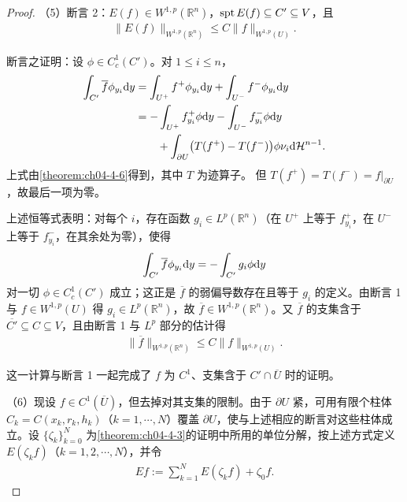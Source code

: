 \documentclass[../../main.tex]{subfiles}%
\begin{document}
\begin{proof}
（5）断言 2：$E(f)\in W^{1,p}(\mathbb{R}^n)$，$\operatorname{spt} E(f)\subseteq C'\subseteq V$，且
\begin{align*}
\lVert E(f)\rVert_{W^{1,p}(\mathbb{R}^n)}\leqslant C\lVert f\rVert_{W^{1,p}(U)}.
\end{align*}

断言之证明：设 $\phi\in C_c^1(C')$。对 $1\leqslant i\leqslant n$，
\begin{align*}
\int_{C'}\overline{f}\phi_{y_i}\mathrm{d} y
&=\int_{U^+}f^+\phi_{y_i}\mathrm{d} y+\int_{U^-}f^-\phi_{y_i}\mathrm{d} y\\
&=-\int_{U^+}f^+_{y_i}\phi\mathrm{d} y-\int_{U^-}f^-_{y_i}\phi\mathrm{d} y\\
&\qquad+\int_{\partial U}\bigl(T(f^+)-T(f^-)\bigr)\phi\nu_i\mathrm{d}\mathcal{H}^{n-1}.
\end{align*}
上式由\cref{theorem:ch04-4-6}得到，其中 $T$ 为迹算子。%
但 $T(f^+)=T(f^-)=f|_{\partial U}$，故最后一项为零。

上述恒等式表明：对每个 $i$，存在函数 $g_i\in L^p(\mathbb{R}^n)$（在 $U^+$ 上等于 $f^+_{y_i}$，在 $U^-$ 上等于 $f^-_{y_i}$，在其余处为零），使得
\begin{align*}
\int_{C'}\overline{f}\phi_{y_i}\mathrm{d} y=-\int_{C'}g_i\phi\mathrm{d} y
\end{align*}
对一切 $\phi\in C_c^1(C')$ 成立；这正是 $\overline{f}$ 的弱偏导数存在且等于 $g_i$ 的定义。由断言 1 与 $f\in W^{1,p}(U)$ 得 $g_i\in L^p(\mathbb{R}^n)$，故 $\overline{f}\in W^{1,p}(\mathbb{R}^n)$。又 $\overline{f}$ 的支集含于 $\overline{C'}\subseteq C\subseteq V$，且由断言 1 与 $L^p$ 部分的估计得
\begin{align*}
\lVert \overline{f}\rVert_{W^{1,p}(\mathbb{R}^n)}\leqslant C\lVert f\rVert_{W^{1,p}(U)}.
\end{align*}

这一计算与断言 1 一起完成了 $f$ 为 $C^1$、支集含于 $C'\cap\overline{U}$ 时的证明。

（6）现设 $f\in C^1(\overline{U})$，但去掉对其支集的限制。由于 $\partial U$ 紧，可用有限个柱体 $C_k=C(x_k,r_k,h_k)$（$k=1,\cdots,N$）覆盖 $\partial U$，使与上述相应的断言对这些柱体成立。设 $\{\zeta_k\}_{k=0}^{N}$ 为\cref{theorem:ch04-4-3}的证明中所用的单位分解，按上述方式定义 $E(\zeta_kf)$（$k=1,2,\cdots,N$），并令%
\begin{align*}
Ef:=\sum_{k=1}^{N}E(\zeta_kf)+\zeta_0f.
\end{align*}


\end{proof}
\end{document}
